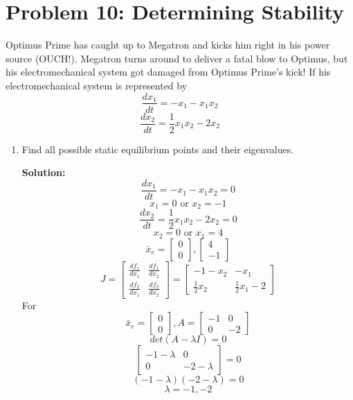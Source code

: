 \documentclass{article}
\begin{document}
\section*{Problem 10: Determining Stability}
Optimus Prime has caught up to Megatron and kicks him right in his power source (OUCH!). Megatron turns around to deliver a fatal blow to Optimus, but his electromechanical system got damaged from Optimus Prime's kick! If his electromechanical system is represented by
\begin{equation}
    \frac{dx_1}{dt} = -x_1 - x_1x_2 \nonumber
\end{equation}
\begin{equation}
    \frac{dx_2}{dt} = \frac{1}{2}x_1x_2-2x_2 \nonumber
\end{equation}
\begin{enumerate}[label=(\alph*)]
    \item {Find all possible static equilibrium points and their eigenvalues.}

\textbf{Solution:}
$$\frac{dx_1}{dt} = -x_1 - x_1x_2 = 0$$
$$x_1 = 0 \text{ or } x_2 = -1$$
$$\frac{dx_2}{dt} = \frac{1}{2}x_1x_2 - 2x_2 = 0$$
$$x_2 = 0 \text{ or } x_1 = 4$$
$$\bar{x}_e = \begin{bmatrix}
    0\\
    0
\end{bmatrix}, \begin{bmatrix}
    4\\
    -1
\end{bmatrix}$$
$$J = \begin{bmatrix}
    \frac{df_1}{dx_1} & \frac{df_1}{dx_2} \\
    \frac{df_2}{dx_1} & \frac{df_2}{dx_2}
\end{bmatrix} = \begin{bmatrix}
    -1 - x_2 & -x_1 \\
    \frac{1}{2}x_2 & \frac{1}{2}x_1 - 2
\end{bmatrix}$$
For 
$$\bar{x}_e = \begin{bmatrix}
    0 \\
    0
\end{bmatrix}, A = \begin{bmatrix}
    -1 & 0 \\
    0 & -2
\end{bmatrix}$$
$$det(A - \lambda  I) = 0$$
$$\begin{bmatrix}
    -1-\lambda & 0 \\
    0 & -2 - \lambda
\end{bmatrix} = 0$$
$$(-1-\lambda)(-2-\lambda) = 0$$
$$\boxed{\lambda = -1, -2}$$


\end{enumerate}
\end{document}
